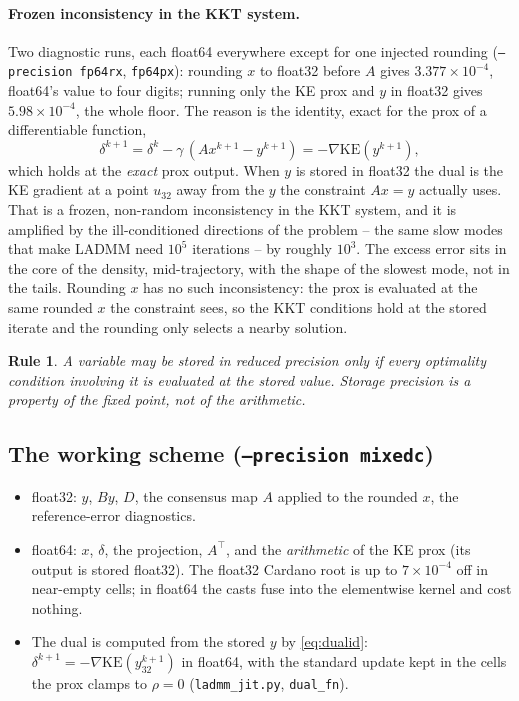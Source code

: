 \documentclass[11pt]{article}
\newtheorem{rule*}{Rule}
\newcommand{\code}[1]{\texttt{#1}}
\newcommand{\KE}{\mathrm{KE}}
\begin{document}
\paragraph{Frozen inconsistency in the KKT system.} Two diagnostic runs, each float64
everywhere except for one injected rounding (\code{--precision fp64rx}, \code{fp64px}):
rounding $x$ to float32 before $A$ gives $3.377\times10^{-4}$, float64's value to four
digits; running only the KE prox and $y$ in float32 gives $5.98\times10^{-4}$, the whole
floor. The reason is the identity, exact for the prox of a differentiable function,
\begin{equation}
  \delta^{k+1} = \delta^k - \gamma\,(A x^{k+1} - y^{k+1}) = -\nabla\KE\!\left(y^{k+1}\right),
  \label{eq:dualid}
\end{equation}
which holds at the \emph{exact} prox output. When $y$ is stored in float32 the dual is
the KE gradient at a point $u_{32}$ away from the $y$ the constraint $Ax=y$ actually
uses. That is a frozen, non-random inconsistency in the KKT system, and it is amplified
by the ill-conditioned directions of the problem -- the same slow modes that make LADMM
need $10^5$ iterations -- by roughly $10^3$. The excess error sits in the core of the
density, mid-trajectory, with the shape of the slowest mode, not in the tails. Rounding
$x$ has no such inconsistency: the prox is evaluated at the same rounded $x$ the
constraint sees, so the KKT conditions hold at the stored iterate and the rounding only
selects a nearby solution.

\begin{rule*}
A variable may be stored in reduced precision only if every optimality condition
involving it is evaluated at the stored value. Storage precision is a property of the
fixed point, not of the arithmetic.
\end{rule*}

\subsection{The working scheme (\code{--precision mixedc})}

\begin{itemize}
  \item float32: $y$, $By$, $D$, the consensus map $A$ applied to the rounded $x$, the
  reference-error diagnostics.
  \item float64: $x$, $\delta$, the projection, $A^{\!\top}$, and the \emph{arithmetic}
  of the KE prox (its output is stored float32). The float32 Cardano root is up to
  $7\times10^{-4}$ off in near-empty cells; in float64 the casts fuse into the
  elementwise kernel and cost nothing.
  \item The dual is computed from the stored $y$ by \eqref{eq:dualid}:
  $\delta^{k+1} = -\nabla\KE(y^{k+1}_{32})$ in float64, with the standard update kept
  in the cells the prox clamps to $\rho=0$ (\code{ladmm\_jit.py}, \code{dual\_fn}).
\end{itemize}
\end{document}
